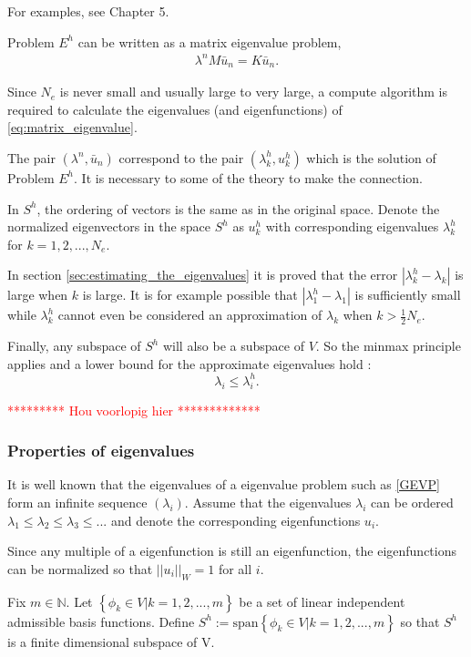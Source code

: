 \documentclass[../../main.tex]{subfiles}
\begin{document}
For examples, see Chapter 5.

Problem $E^h$ can be written as a matrix eigenvalue problem,
\begin{eqnarray}
	\lambda^nM\bar{u}_n = K\bar{u}_n. \label{eq:matrix_eigenvalue}
\end{eqnarray} 

Since $N_e$ is never small and usually large to very large, a compute algorithm is required to calculate the eigenvalues (and eigenfunctions) of \eqref{eq:matrix_eigenvalue}.

The pair $(\lambda^n, \bar{u}_n)$ correspond to the pair $(\lambda^h_k, u^h_k)$ which is the solution of Problem $E^h$. It is necessary to some of the theory to make the connection.

In $S^h$, the ordering of vectors is the same as in the original space. Denote the normalized eigenvectors in the space $S^h$ as $u^h_k$ with corresponding eigenvalues $\lambda^h_k$ for $k = 1,2,...,N_e$.

In section \ref{sec:estimating_the_eigenvalues} it is proved that the error $| \lambda_k^h - \lambda_k|$ is large when $k$ is large. It is for example possible that $|\lambda^h_1 - \lambda_1|$ is sufficiently small while $\lambda^h_k$ cannot even be considered an approximation of $\lambda_k$ when $\displaystyle k > \frac{1}{2}N_e$.

Finally, any subspace of $S^h$ will also be a subspace of $V$. So the minmax principle applies and a lower bound for the approximate eigenvalues hold \cite{SF73}:
\begin{equation}
	\lambda_i \leq \lambda_i^h.
\end{equation}

\textcolor{red}{********* Hou voorlopig hier *************}
\subsubsection*{Properties of eigenvalues}
It is well known that the eigenvalues of a eigenvalue problem such as \eqref{GEVP} form an infinite sequence $(\lambda_i)$. Assume that the eigenvalues $\lambda_i$ can be ordered $\lambda_1 \leq \lambda_2 \leq \lambda_3 \leq ...$ and denote the corresponding eigenfunctions $u_i$.

Since any multiple of a eigenfunction is still an eigenfunction, the eigenfunctions can be normalized so that $||u_i||_{W} = 1$ for all $i$.

Fix $m \in \mathbb{N}$. Let $\left\{ \phi_k \in V | k = 1,2,...,m \right\}$ be a set of linear independent admissible basis functions. Define $S^h := \text{span}\left\{\phi_k \in V | k = 1,2,...,m\right\}$ so that $S^h$ is a finite dimensional subspace of V. \label{sym:natural} \label{sym:Sh1}
\end{document}
